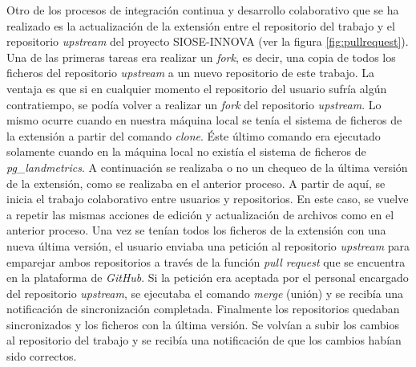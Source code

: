 Otro de los procesos de integración continua y desarrollo colaborativo que se ha realizado es la actualización de la extensión entre el repositorio del trabajo y el repositorio \textit{upstream} del proyecto SIOSE-INNOVA (ver la figura \ref{fig:pullrequest}). Una de las primeras tareas era realizar un \textit{fork}, es decir, una copia de todos los ficheros del repositorio \textit{upstream} a un nuevo repositorio de este trabajo. La ventaja es que si en cualquier momento el repositorio del usuario sufría algún contratiempo, se podía volver a realizar un \textit{fork} del repositorio \textit{upstream}. Lo mismo ocurre cuando en nuestra máquina local se tenía el sistema de ficheros de la extensión a partir del comando \textit{clone}. Éste último comando era ejecutado solamente cuando en la máquina local no existía el sistema de ficheros de \textit{pg\_landmetrics}. A continuación se realizaba o no un chequeo de la última versión de la extensión, como se realizaba en el anterior proceso. A partir de aquí, se inicia el trabajo colaborativo entre usuarios y repositorios. En este caso, se vuelve a repetir las mismas acciones de edición y actualización de archivos como en el anterior proceso. Una vez se tenían todos los ficheros de la extensión con una nueva última versión, el usuario enviaba una petición al repositorio \textit{upstream} para emparejar ambos repositorios a través de la función \textit{pull request} que se encuentra en la plataforma de \textit{GitHub}. Si la petición era aceptada por el personal encargado del repositorio \textit{upstream}, se ejecutaba el comando \textit{merge} (unión) y se recibía una notificación de sincronización completada. Finalmente los repositorios quedaban sincronizados y los ficheros con la última versión. Se volvían a subir los cambios al repositorio del trabajo y se recibía una notificación de que los cambios habían sido correctos.

